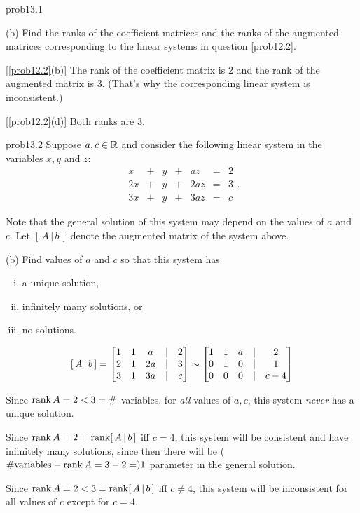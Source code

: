 
\begin{sol}{prob13.1} 

 

(b) Find the ranks of the coefficient matrices and the ranks of the augmented matrices corresponding to the linear systems in question \ref{prob12.2}.

\soln



 [\ref{prob12.2}(b)] The rank of the coefficient matrix is 2 and the rank of the augmented matrix is 3. (That's why the corresponding  linear system is inconsistent.)
\medskip

[\ref{prob12.2}(d)] Both ranks are 3.

\medskip 
%
\end{sol}

\begin{sol}{prob13.2} Suppose $a,c\in \mathbb{R}$   and consider the following linear system
in the variables
$x,y$ and $z$: 
$$\begin{matrix}  x&+&y &+&az&=&2\\
2x&+&y&+&2a z  &=&3\\ 
3x&+&y &+&3az&=&c \end{matrix}. $$

Note that the general solution of this system may depend on the 
values of $a$ and $c$. Let $[\,A\,|\, b\,]$ denote  the
augmented matrix of the
system above.

\medskip 
(b)  Find  values of
$a$ and $c$ so that
this system has \smallskip
\begin{enumerate}[(i)]
  
\item a unique solution,\smallskip
\item  infinitely many
solutions,  or \smallskip
\item  
no solutions. 
\end{enumerate}

\soln  

$$[\,A\,|\, b\,] =\bmatrix 1&1&a&|&2\\ 2&1&2a&|&3\\ 3&1&3a&|&c\endbmatrix \sim
\bmatrix 1&1&a&|&2\\ 0&1&0&|&1\\ 0&0&0&|&c-4\endbmatrix $$

Since $\operatorname{rank} A=2<3=\#$ variables,  for {\it all} values of $a,c$, this system {\it never} has a unique solution.
\smallskip

Since $\operatorname{rank} A=2=\operatorname{rank}[\,A\,|\, b\,]$ iff $c=4$, this system will be consistent and have infinitely many
solutions, since then there will be  ($\#\text{variables}-\operatorname{rank} A=3-2=)1$  parameter in the general solution.
\smallskip

Since $\operatorname{rank} A=2<3=\operatorname{rank}[\,A\,|\, b\,]$ iff $c\not=4$, this system will be inconsistent for all values of $c$ except for $c=4$.
\medskip



\end{sol}



